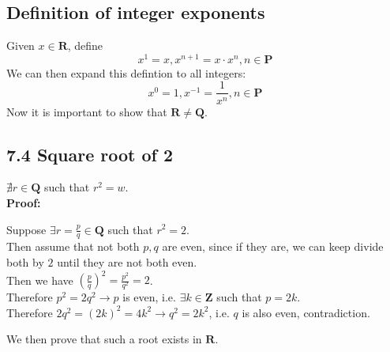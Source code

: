 \documentclass{article}
\begin{document}
\subsection*{Definition of integer exponents}
Given $x \in \mathbf{R}$, define
\begin{equation*}
    x^1 = x, x^{n+1} = x\cdot x^n, n \in \mathbf{P}
\end{equation*}
We can then expand this defintion to all integers:
\begin{equation*}
    x^0 = 1, x^{-1} = \frac{1}{x^n}, n \in \mathbf{P}
\end{equation*}
Now it is important to show that $\mathbf{R} \neq \mathbf{Q}$.
\subsection*{7.4 Square root of 2}
$\nexists r \in \mathbf{Q}$ such that $r^2 = w$.\\
\textbf{Proof:}
\begin{addmargin}[1em]{0em}
    Suppose $\exists r = \frac{p}{q} \in \mathbf{Q}$ such that $r^2 = 2$.\\
    Then assume that not both $p, q$ are even, since if they are, we can keep divide both by $2$ until they are not both even.\\
    Then we have $(\frac{p}{q})^2 = \frac{p^2}{q^2} = 2$.\\
    Therefore $p^2 = 2q^2 \rightarrow p$ is even, i.e. $\exists k \in \mathbf{Z}$ such that $p  = 2k$.\\
    Therefore $2q^2 = (2k)^2 = 4k^2 \rightarrow q^2 = 2k^2$, i.e. $q$ is also even, contradiction.
\end{addmargin}
We then prove that such a root exists in $\mathbf{R}$.
\end{document}
